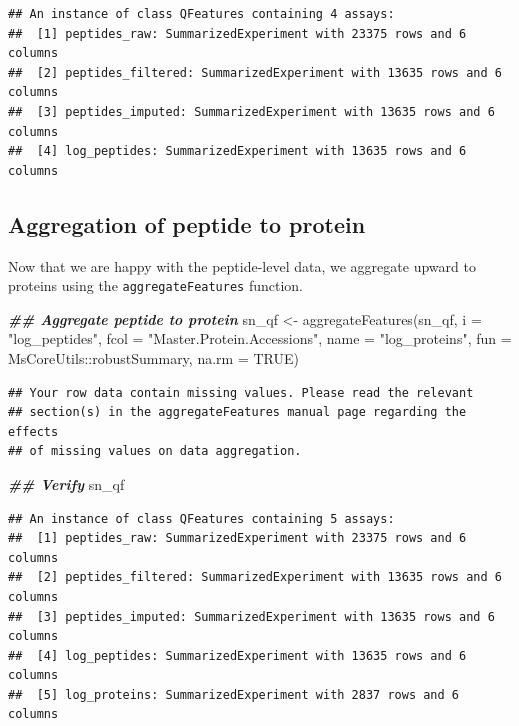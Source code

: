 \documentclass[9pt,a4paper,]{extarticle}
\newenvironment{Shaded}{\begin{snugshade}}{\end{snugshade}}
\newcommand{\AttributeTok}[1]{\textcolor[rgb]{0.77,0.63,0.00}{#1}}
\newcommand{\ConstantTok}[1]{\textcolor[rgb]{0.00,0.00,0.00}{#1}}
\newcommand{\DocumentationTok}[1]{\textcolor[rgb]{0.56,0.35,0.01}{\textbf{\textit{#1}}}}
\newcommand{\FunctionTok}[1]{\textcolor[rgb]{0.00,0.00,0.00}{#1}}
\newcommand{\NormalTok}[1]{#1}
\newcommand{\OtherTok}[1]{\textcolor[rgb]{0.56,0.35,0.01}{#1}}
\newcommand{\SpecialCharTok}[1]{\textcolor[rgb]{0.00,0.00,0.00}{#1}}
\newcommand{\StringTok}[1]{\textcolor[rgb]{0.31,0.60,0.02}{#1}}
\begin{document}
\begin{verbatim}
## An instance of class QFeatures containing 4 assays:
##  [1] peptides_raw: SummarizedExperiment with 23375 rows and 6 columns 
##  [2] peptides_filtered: SummarizedExperiment with 13635 rows and 6 columns 
##  [3] peptides_imputed: SummarizedExperiment with 13635 rows and 6 columns 
##  [4] log_peptides: SummarizedExperiment with 13635 rows and 6 columns
\end{verbatim}

\hypertarget{aggregation-of-peptide-to-protein}{%
\subsection{Aggregation of peptide to protein}\label{aggregation-of-peptide-to-protein}}

Now that we are happy with the peptide-level data, we aggregate upward to
proteins using the \texttt{aggregateFeatures} function.

\begin{Shaded}
\begin{Highlighting}[]
\DocumentationTok{\#\# Aggregate peptide to protein}
\NormalTok{sn\_qf }\OtherTok{\textless{}{-}} \FunctionTok{aggregateFeatures}\NormalTok{(sn\_qf,}
                           \AttributeTok{i =} \StringTok{"log\_peptides"}\NormalTok{,}
                           \AttributeTok{fcol =} \StringTok{"Master.Protein.Accessions"}\NormalTok{,}
                           \AttributeTok{name =} \StringTok{"log\_proteins"}\NormalTok{,}
                           \AttributeTok{fun =}\NormalTok{ MsCoreUtils}\SpecialCharTok{::}\NormalTok{robustSummary,}
                           \AttributeTok{na.rm =} \ConstantTok{TRUE}\NormalTok{)}
\end{Highlighting}
\end{Shaded}

\begin{verbatim}
## Your row data contain missing values. Please read the relevant
## section(s) in the aggregateFeatures manual page regarding the effects
## of missing values on data aggregation.
\end{verbatim}

\begin{Shaded}
\begin{Highlighting}[]
\DocumentationTok{\#\# Verify}
\NormalTok{sn\_qf}
\end{Highlighting}
\end{Shaded}

\begin{verbatim}
## An instance of class QFeatures containing 5 assays:
##  [1] peptides_raw: SummarizedExperiment with 23375 rows and 6 columns 
##  [2] peptides_filtered: SummarizedExperiment with 13635 rows and 6 columns 
##  [3] peptides_imputed: SummarizedExperiment with 13635 rows and 6 columns 
##  [4] log_peptides: SummarizedExperiment with 13635 rows and 6 columns 
##  [5] log_proteins: SummarizedExperiment with 2837 rows and 6 columns
\end{verbatim}
\end{document}
